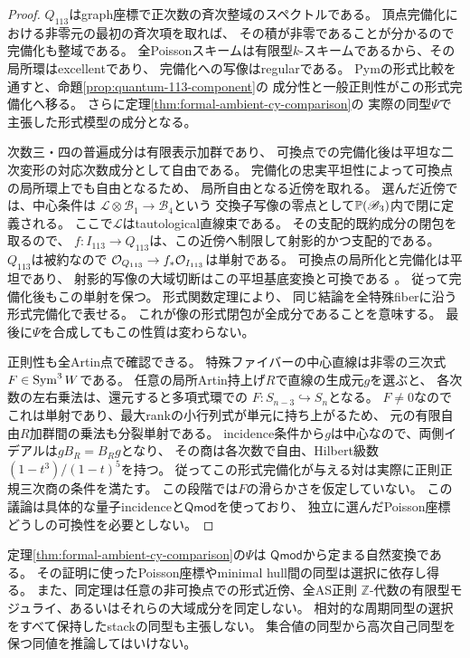 \begin{proof}
$Q_{113}$はgraph座標で正次数の斉次整域のスペクトルである。
頂点完備化における非零元の最初の斉次項を取れば、
その積が非零であることが分かるので完備化も整域である。
全Poissonスキームは有限型$k$-スキームであるから、その局所環はexcellentであり、
完備化への写像はregularである\cite[Tag~07QS]{StacksFormal}。
Pymの形式比較を通すと、命題\ref{prop:quantum-113-component}の
成分性と一般正則性がこの形式完備化へ移る。
さらに定理\ref{thm:formal-ambient-cy-comparison}の
実際の同型$\Psi$で主張した形式模型の成分となる。

次数三・四の普遍成分は有限表示加群であり、
可換点での完備化後は平坦な二次変形の対応次数成分として自由である。
完備化の忠実平坦性によって可換点の局所環上でも自由となるため、
局所自由となる近傍を取れる。
選んだ近傍では、中心条件は
$\mathscr L\otimes\mathscr B_1\to\mathscr B_4$という
交換子写像の零点として$\mathbb P(\mathscr B_3)$内で閉に定義される。
ここで$\mathscr L$はtautological直線束である。
その支配的既約成分の閉包を取るので、
$f:I_{113}\to Q_{113}$は、この近傍へ制限して射影的かつ支配的である。
$Q_{113}$は被約なので
$\mathcal O_{Q_{113}}\to f_*\mathcal O_{I_{113}}$は単射である。
可換点の局所化と完備化は平坦であり、
射影的写像の大域切断はこの平坦基底変換と可換である
\cite[Tag~02KH]{StacksFormal}。
従って完備化後もこの単射を保つ。
形式関数定理\cite[Tag~02OC]{StacksFormal}により、
同じ結論を全特殊fiberに沿う形式完備化で表せる。
これが像の形式閉包が全成分であることを意味する。
最後に$\Psi$を合成してもこの性質は変わらない。

正則性も全Artin点で確認できる。
特殊ファイバーの中心直線は非零の三次式$F\in\operatorname{Sym}^3W$である。
任意の局所Artin持上げ$R$で直線の生成元$g$を選ぶと、
各次数の左右乗法は、還元すると多項式環での
$F:S_{n-3}\hookrightarrow S_n$となる。
$F\ne0$なのでこれは単射であり、最大rankの小行列式が単元に持ち上がるため、
元の有限自由$R$加群間の乗法も分裂単射である。
incidence条件から$g$は中心なので、両側イデアルは$gB_R=B_Rg$となり、
その商は各次数で自由、Hilbert級数$(1-t^3)/(1-t)^5$を持つ。
従ってこの形式完備化が与える対は実際に正則正規三次商の条件を満たす。
この段階では$F$の滑らかさを仮定していない。
この議論は具体的な量子incidenceと$\mathsf{Qmod}$を使っており、
独立に選んだPoisson座標どうしの可換性を必要としない。
\end{proof}

\begin{remark}[形式同型の意味と大域化]
定理\ref{thm:formal-ambient-cy-comparison}の$\Psi$は
$\mathsf{Qmod}$から定まる自然変換である。
その証明に使ったPoisson座標やminimal hull間の同型は選択に依存し得る。
また、同定理は任意の非可換点での形式近傍、全AS正則
$\mathbb Z$-代数の有限型モジュライ、あるいはそれらの大域成分を同定しない。
相対的な周期同型の選択をすべて保持したstackの同型も主張しない。
集合値の同型から高次自己同型を保つ同値を推論してはいけない。
\end{remark}

